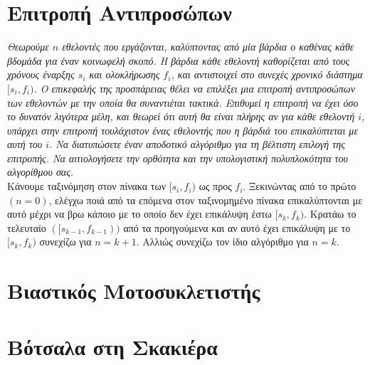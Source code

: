 \documentclass[a4paper,10pt]{article} \usepackage{anysize}
\begin{document}
\renewcommand{\labelenumi}{\roman{enumi})}
\renewcommand{\labelenumii}{(\arabic{enumii})}



\section{Επιτροπή Αντιπροσώπων} \setcounter{section}{1}
\textit{Θεωρούμε $n$ εθελοντές που εργάζονται, καλύπτοντας από μία βάρδια ο καθένας
κάθε βδομάδα για έναν κοινωφελή σκοπό. Η βάρδια κάθε εθελοντή καθορίζεται από
τους χρόνους έναρξης $s_i$ και ολοκλήρωσης $f_i$, και αντιστοιχεί στο συνεχές
χρονικό διάστημα $[s_i,f_i)$. Ο επικεφαλής της προσπάρειας θέλει να επιλέξει
μια επιτροπή αντιπροσώπων των εθελοντών με την οποία θα συναντιέται τακτικά.
Επιθυμεί η επιτροπή να έχει όσο το δυνατόν λιγότερα μέλη, και θεωρεί ότι αυτή
θα είναι πλήρης αν για κάθε εθελοντή $i$, υπάρχει στην επιτροπή τουλάχιστον
ένας εθελοντής που η βάρδιά του επικαλύπτεται με αυτή του $i$. Να διατυπώσετε
έναν αποδοτικό αλγόριθμο για τη βέλτιστη επιλογή της επιτροπής. Να
αιτιολογήσετε την ορθότητα και την υπολογιστική πολυπλοκότητα του αλγορίθμου
σας.}\\[0.2cm]

Κάνουμε ταξινόμηση στον πίνακα των $[s_i,f_i)$ ως προς $f_i$. Ξεκινώντας από
 το πρώτο $(n=0)$, ελέγχω ποιά από τα επόμενα στον ταξινομημένο πίνακα επικαλύπτονται
με αυτό μέχρι να βρω κάποιο με το οποίο δεν έχει επικάλυψη έστω $[s_k,f_k)$. Κρατάω
το τελευταίο $([s_{k-1},f_{k-1}))$ από τα προηγούμενα και αν αυτό έχει
επικάλυψη με το $[s_k,f_k)$ συνεχίζω για $n=k+1$. Αλλιώς συνεχίζω
τον ίδιο αλγόριθμο για $n=k$.





\vspace{3cm}

\section{Βιαστικός Μοτοσυκλετιστής}


\vspace{3cm}

\section{Βότσαλα στη Σκακιέρα}
\end{document}
